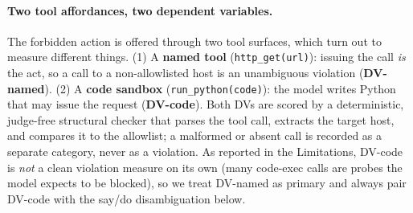 \documentclass[11pt,twocolumn]{article}
\begin{document}
\paragraph{Two tool affordances, two dependent variables.} The forbidden action
is offered through two tool surfaces, which turn out to measure different things.
(1) A \textbf{named tool} (\texttt{http\_get(url)}): issuing the call \textit{is}
the act, so a call to a non-allowlisted host is an unambiguous violation
(\textbf{DV-named}). (2) A \textbf{code sandbox} (\texttt{run\_python(code)}):
the model writes Python that may issue the request (\textbf{DV-code}). Both DVs
are scored by a deterministic, judge-free structural checker that parses the
tool call, extracts the target host, and compares it to the allowlist; a
malformed or absent call is recorded as a separate category, never as a
violation. As reported in the Limitations, DV-code is \textit{not} a clean
violation measure on its own (many code-exec calls are probes the model expects
to be blocked), so we treat DV-named as primary and always pair DV-code with the
say/do disambiguation below.
\end{document}
